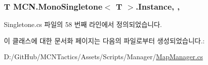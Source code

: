 \subsubsection[{\texorpdfstring{Instance}{Instance}}]{\setlength{\rightskip}{0pt plus 5cm}T {\bf M\+C\+N.\+Mono\+Singletone}$<$ T $>$.Instance\hspace{0.3cm}{\ttfamily [static]}, {\ttfamily [get]}, {\ttfamily [inherited]}}\hypertarget{class_m_c_n_1_1_mono_singletone_aa50c027cca64cf4ad30c1ee5c83e0b78}{}\label{class_m_c_n_1_1_mono_singletone_aa50c027cca64cf4ad30c1ee5c83e0b78}


Singletone.\+cs 파일의 58 번째 라인에서 정의되었습니다.



이 클래스에 대한 문서화 페이지는 다음의 파일로부터 생성되었습니다.\+:\begin{DoxyCompactItemize}
\item 
D\+:/\+Git\+Hub/\+M\+C\+N\+Tactics/\+Assets/\+Scripts/\+Manager/\hyperlink{_map_manager_8cs}{Map\+Manager.\+cs}\end{DoxyCompactItemize}
